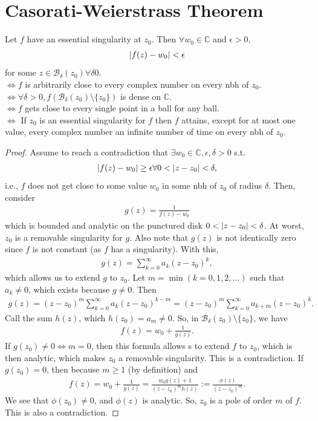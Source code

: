 \documentclass{article}
\theoremstyle{definition}
\newcommand{\f}[2]{\frac{#1}{#2}}
\newcommand{\C}{\mathbb{C}}
\newcommand{\B}{\mathcal{B}}
\begin{document}
\section{Casorati-Weierstrass Theorem}

Let  $f$ have an essential singularity at $z_0$. Then $\forall w_0 \in \C$ and $\epsilon > 0$,
\begin{align}
\abs{f(z) - w_0} < \epsilon 
\end{align}
for some $z\in \mathcal{B}_\delta(z_0) \forall \delta  0$.\\
$\iff f$ is arbitrarily close to every complex number on every nbh of $z_0$.\\
$\iff \forall \delta > 0, f(\mathcal{B}_\delta(z_0)\setminus\{z_0\} )$ is dense on $\C$. \\
$\iff f$ gets close to every single point in a ball for any ball.\\
$\iff$ If $z_0$ is an essential singularity for $f$ then $f$ attains, except for at most one value, every complex number an infinite  number of time on every nbh of $z_0$.\\

\noindent \begin{proof}
	Assume to reach a contradiction that $\exists w_0 \in \C, \epsilon, \delta >0 $ s.t.
	\begin{align}
	\abs{f(z) - w_0} \geq \epsilon \forall 0 < \abs{z-z_0} < \delta,
	\end{align} 
	i.e., $f$ does not get close to some value $w_0$ in some nbh of $z_0$ of radius $\delta$. Then, consider 
	\begin{align}
	g(z) = \f{1}{f(z) - w_0}
	\end{align} 
	which is bounded and analytic on the punctured disk $0 < \abs{z-z_0} < \delta$. At worst, $z_0$ is a removable singularity for $g$. Also note that $g(z)$ is not identically zero since $f$ is not constant (as $f$ has a singularity). With this, 
	\begin{align}
	g(z) = \sum^\infty_{k=0}a_k (z-z_0)^k,
	\end{align}  
	which allows us to extend $g$ to $z_0$. Let $m = \min(k=0,1,2,\dots)$ such that $a_k \neq 0$, which exists because $g\neq 0$. Then
	\begin{align}
	g(z) = (z-z_0)^m\sum^\infty_{k=0}a_k (z-z_0)^{k-m} = (z-z_0)^m\sum^\infty_{k=0}a_{k+m} (z-z_0)^k.
	\end{align}
	Call the sum $h(z)$, which $h(z_0) = a_m \neq 0$. So, in $\B_\delta(z_0)\setminus\{z_0\}$, we have
	\begin{align}
	f(z)  =w_0 + \f{1}{g(z)}.
	\end{align}
	If $g(z_0) \neq 0 \iff m= 0$, then this formula allows s to extend $f$ to $z_0$, which is then analytic, which makes $z_0$ a removable singularity. This is a contradiction. If $g(z_0) = 0$, then because $ m\geq 1$ (by definition) and
	\begin{align}
	f(z) = w_0 + \f{1}{g(z)} = \f{w_0 g(z) + 1}{(z-z_0)^m h(z)} := \f{\phi(z)}{(z - z_0)^m}.
	\end{align} 
	We see that $\phi(z_0) \neq 0$, and $\phi(z)$ is analytic. So, $z_0$ is a pole of order $m$ of $f$. This is also a contradiction. \qedhere
	
\end{proof}
\end{document}
